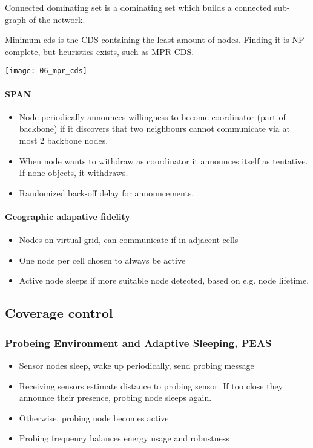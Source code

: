 Connected dominating set is a dominating set which builds a connected sub-graph
of the network.

Minimum cds is the CDS containing the least amount of nodes. Finding it is
NP-complete, but heuristics exists, such as MPR-CDS.

\texttt{[image: 06\_mpr\_cds]}

\paragraph{SPAN}

\begin{itemize}
		\item Node periodically announces willingness to become coordinator
				(part of backbone) if it discovers that two neighbours cannot
				communicate via at most 2 backbone nodes.
		\item When node wants to withdraw as coordinator it announces itself as
				tentative. If none objects, it withdraws.
		\item Randomized back-off delay for announcements.
\end{itemize}

\paragraph{Geographic adapative fidelity}

\begin{itemize}
		\item Nodes on virtual grid, can communicate if in adjacent cells
		\item One node per cell chosen to always be active
		\item Active node sleeps if more suitable node detected, based on e.g.
				node lifetime.
\end{itemize}

\subsection{Coverage control}

\subsubsection{Probeing Environment and Adaptive Sleeping, PEAS}

\begin{itemize}
		\item Sensor nodes sleep, wake up periodically, send probing message
		\item Receiving sensors estimate distance to probing sensor. If too
				close they announce their presence, probing node sleeps again.
		\item Otherwise, probing node becomes active
		\item Probing frequency balances energy usage and robustness
\end{itemize}

